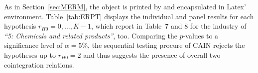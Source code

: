 As in Section~\ref{sec:MERM}, the  object is printed by  and encapsulated in Latex'  environment. Table~\ref{tab:ERPT} displays the individual and panel results for each hypothesis $ r_{H0} = 0, \ldots, K-1 $, which \citet[p.~22]{ArsovaOersal2016} report in Table~7 and 8 for the industry of \textit{``5: Chemicals and related products''}, too. Comparing the $p$-values to a significance level of $ \alpha = 5 \% $, the sequential testing procure of CAIN rejects the hypotheses up to $ r_{H0} = 2 $ and thus suggests the presence of overall two cointegration relations.


